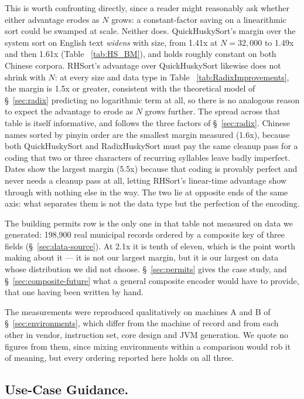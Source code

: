 \documentclass[twoside,leqno,twocolumn]{article}
\begin{document}
This is worth confronting directly, since a reader might reasonably ask whether either advantage erodes
as $N$ grows: a constant-factor saving on a linearithmic sort could be swamped at scale.
Neither does.
QuickHuskySort's margin over the system sort on English text \emph{widens} with size,
from 1.41x at $N=32{,}000$ to 1.49x and then 1.61x (Table ~\ref{tab:HS_BM}),
and holds roughly constant on both Chinese corpora.
RHSort's advantage over QuickHuskySort likewise does not shrink with $N$:
at every size and data type in Table ~\ref{tab:RadixImprovements}, the margin is 1.5x or greater,
consistent with the theoretical model of \S~\ref{sec:radix} predicting no logarithmic term at all,
so there is no analogous reason to expect the advantage to erode as $N$ grows further.
The spread across that table is itself informative, and follows the three factors of \S~\ref{sec:radix}.
Chinese names sorted by pinyin order are the smallest margin measured (1.6x),
because both QuickHuskySort and RadixHuskySort must pay the same cleanup pass for a coding
that two or three characters of recurring syllables leave badly imperfect.
Dates show the largest margin (5.5x) because that coding is provably perfect and never needs a cleanup pass at all,
letting RHSort's linear-time advantage show through with nothing else in the way.
The two lie at opposite ends of the same axis: what separates them is not the data type but the perfection of the encoding.

The building permits row is the only one in that table not measured on data we generated:
198,900 real municipal records ordered by a composite key of three fields (\S~\ref{sec:data-source}).
At 2.1x it is tenth of eleven, which is the point worth making about it --- it is not our largest
margin, but it is our largest on data whose distribution we did not choose.
\S~\ref{sec:permits} gives the case study, and \S~\ref{sec:composite-future} what a general
composite encoder would have to provide, that one having been written by hand.

The measurements were reproduced qualitatively on machines A and B of \S~\ref{sec:environments},
which differ from the machine of record and from each other in vendor, instruction set, core design and
JVM generation.
We quote no figures from them, since mixing environments within a comparison would rob it of meaning,
but every ordering reported here holds on all three.

\subsection{Use-Case Guidance.}
\label{sec:usecase}
\end{document}
